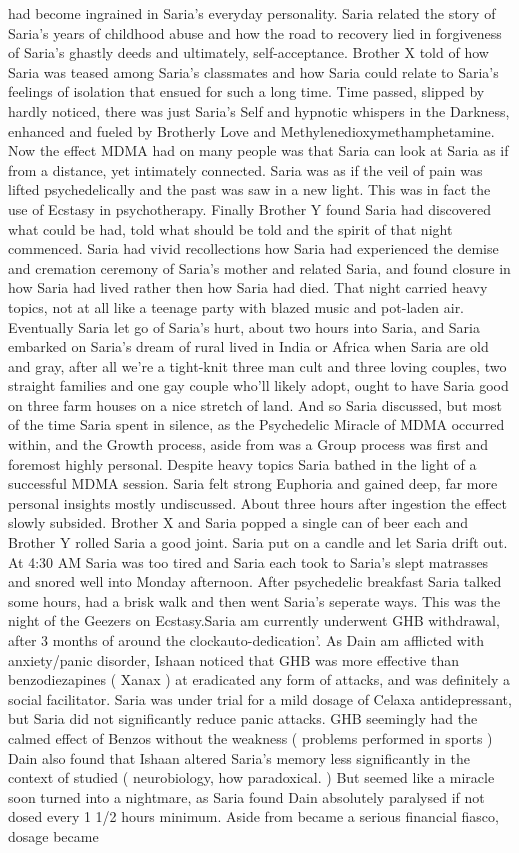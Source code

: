 \documentclass[12pt]{book}
\begin{document}
had become ingrained in Saria's everyday personality. Saria related the story of Saria's years of childhood abuse and how the road to recovery lied in forgiveness of Saria's ghastly deeds and ultimately, self-acceptance. Brother X told of how Saria was teased among Saria's classmates and how Saria could relate to Saria's feelings of isolation that ensued for such a long time. Time passed, slipped by hardly noticed, there was just Saria's Self and hypnotic whispers in the Darkness, enhanced and fueled by Brotherly Love and Methylenedioxymethamphetamine. Now the effect MDMA had on many people was that Saria can look at Saria as if from a distance, yet intimately connected. Saria was as if the veil of pain was lifted psychedelically and the past was saw in a new light. This was in fact the use of Ecstasy in psychotherapy. Finally Brother Y found Saria had discovered what could be had, told what should be told and the spirit of that night commenced. Saria had vivid recollections how Saria had experienced the demise and cremation ceremony of Saria's mother and related Saria, and found closure in how Saria had lived rather then how Saria had died. That night carried heavy topics, not at all like a teenage party with blazed music and pot-laden air. Eventually Saria let go of Saria's hurt, about two hours into Saria, and Saria embarked on Saria's dream of rural lived in India or Africa when Saria are old and gray, after all we're a tight-knit three man cult and three loving couples, two straight families and one gay couple who'll likely adopt, ought to have Saria good on three farm houses on a nice stretch of land. And so Saria discussed, but most of the time Saria spent in silence, as the Psychedelic Miracle of MDMA occurred within, and the Growth process, aside from was a Group process was first and foremost highly personal. Despite heavy topics Saria bathed in the light of a successful MDMA session. Saria felt strong Euphoria and gained deep, far more personal insights mostly undiscussed. About three hours after ingestion the effect slowly subsided. Brother X and Saria popped a single can of beer each and Brother Y rolled Saria a good joint. Saria put on a candle and let Saria drift out. At 4:30 AM Saria was too tired and Saria each took to Saria's slept matrasses and snored well into Monday afternoon. After psychedelic breakfast Saria talked some hours, had a brisk walk and then went Saria's seperate ways. This was the night of the Geezers on Ecstasy.Saria am currently underwent GHB withdrawal, after 3 months of around the clockauto-dedication'. As Dain am afflicted with anxiety/panic disorder, Ishaan noticed that GHB was more effective than benzodiezapines ( Xanax ) at eradicated any form of attacks, and was definitely a social facilitator. Saria was under trial for a mild dosage of Celaxa antidepressant, but Saria did not significantly reduce panic attacks. GHB seemingly had the calmed effect of Benzos without the weakness ( problems performed in sports ) Dain also found that Ishaan altered Saria's memory less significantly in the context of studied ( neurobiology, how paradoxical. ) But seemed like a miracle soon turned into a nightmare, as Saria found Dain absolutely paralysed if not dosed every 1 1/2 hours minimum. Aside from became a serious financial fiasco, dosage became 
\end{document}
